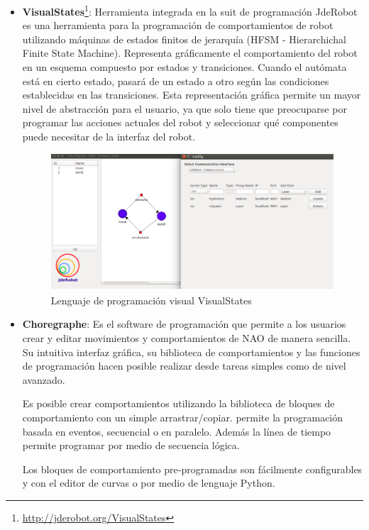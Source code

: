 \begin{itemize}
\item \textbf{VisualStates}\footnote{\url{http://jderobot.org/VisualStates}}: Herramienta integrada en la suit de programación JdeRobot es una herramienta para la programación de comportamientos de robot utilizando máquinas de estados finitos de jerarquía (HFSM - Hierarchichal Finite State Machine). Representa gráficamente el comportamiento del robot en un esquema compuesto por estados y transiciones. Cuando el autómata está en cierto estado, pasará de un estado a otro según las condiciones establecidas en las transiciones. Esta representación gráfica permite un mayor nivel de abstracción para el usuario, ya que solo tiene que preocuparse por programar las acciones actuales del robot y seleccionar qué componentes puede necesitar de la interfaz del robot.\\


\begin{figure}[H]
\centering
\includegraphics[scale=0.40]{img/visualstates.png}
\caption{Lenguaje de programación visual VisualStates}
\label{fig:visualstates}
\end{figure}

\item \textbf{Choregraphe}: Es el software de programación que permite a los usuarios crear y editar movimientos y comportamientos de NAO de manera sencilla. Su intuitiva interfaz gráfica, su biblioteca de comportamientos y las funciones de programación hacen posible realizar desde tareas simples como de nivel avanzado.

Es posible crear comportamientos utilizando la biblioteca de bloques de comportamiento con un simple arrastrar/copiar.
permite la programación basada en eventos, secuencial o en paralelo. Además la línea de tiempo permite programar por medio de secuencia lógica.

Los bloques de comportamiento pre-programadas son fácilmente configurables y con el editor de curvas o por medio de lenguaje Python.\\


\end{itemize}